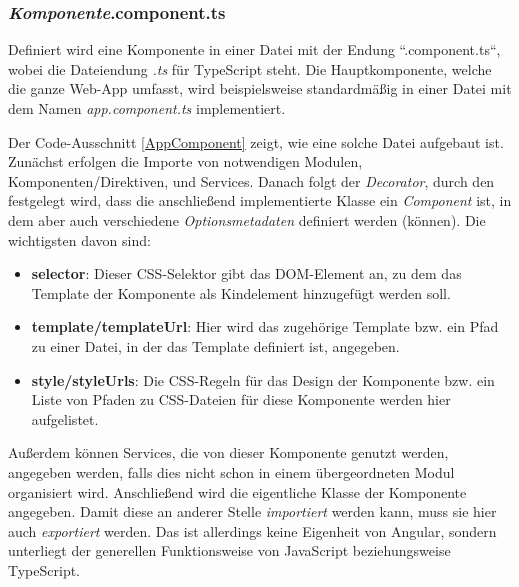 \subsubsection{\textit{Komponente}.component.ts}
\label{sec:technologies:angular:component:ts}
Definiert wird eine Komponente in einer Datei mit der Endung ``.component.ts``, wobei die Dateiendung \textit{.ts} für TypeScript steht. Die Hauptkomponente, welche die ganze Web-App umfasst, wird beispielsweise standardmäßig in einer Datei mit dem Namen \textit{app.component.ts} implementiert.

Der Code-Ausschnitt \ref{AppComponent} zeigt, wie eine solche Datei aufgebaut ist. Zunächst erfolgen die Importe von notwendigen Modulen, Komponenten/Direktiven, und Services. Danach folgt der \textit{Decorator}, durch den festgelegt wird, dass die anschließend implementierte Klasse ein \textit{Component} ist, in dem aber auch verschiedene \textit{Optionsmetadaten} definiert werden (können). Die wichtigsten davon sind:

\begin{itemize}
\item \textbf{selector}: Dieser CSS-Selektor gibt das \acs{DOM}-Element an, zu dem das Template der Komponente als Kindelement hinzugefügt werden soll. 
\item \textbf{template/templateUrl}: Hier wird das zugehörige Template bzw. ein Pfad zu einer Datei, in der das Template definiert ist, angegeben.
\item \textbf{style/styleUrls}: Die CSS-Regeln für das Design der Komponente bzw. ein Liste von Pfaden zu CSS-Dateien für diese Komponente werden hier aufgelistet.
\end{itemize} 

Außerdem können Services, die von dieser Komponente genutzt werden, angegeben werden, falls dies nicht schon in einem übergeordneten Modul organisiert wird. Anschließend wird die eigentliche Klasse der Komponente angegeben. Damit diese an anderer Stelle \textit{importiert} werden kann, muss sie hier auch \textit{exportiert} werden. Das ist allerdings keine Eigenheit von Angular, sondern unterliegt der generellen Funktionsweise von JavaScript beziehungsweise TypeScript.

